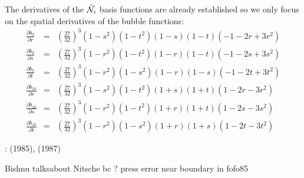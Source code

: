 The derivatives of the $\tilde{{\mathcal{N}}}_i$ basis functions are already established so we only focus on the spatial derivatives of the bubble functions:
\begin{eqnarray}
\frac{\partial b_9}{\partial r} 
&=& \left(\frac{27}{32}\right)^3 (1-s^2)(1-t^2) (1-s)(1-t) (-1-2r+3r^2  )\nonumber\\
\frac{\partial b_9}{\partial s}
&=& \left(\frac{27}{32}\right)^3 (1-r^2)(1-t^2) (1-r)(1-t) (-1-2s+3s^2  )\nonumber\\
\frac{\partial b_9}{\partial t}
&=& \left(\frac{27}{32}\right)^3 (1-r^2)(1-s^2) (1-r)(1-s) (-1-2t+3t^2  )\nonumber\\
\frac{\partial b_{10}}{\partial r} 
&=& \left(\frac{27}{32}\right)^3 (1-s^2)(1-t^2) (1+s)(1+t) (1-2r-3r^2  )\nonumber\\
\frac{\partial b_{10}}{\partial s}
&=& \left(\frac{27}{32}\right)^3 (1-r^2)(1-t^2) (1+r)(1+t) (1-2s-3s^2  )\nonumber\\
\frac{\partial b_{10}}{\partial t} 
&=& \left(\frac{27}{32}\right)^3 (1-r^2)(1-s^2) (1+r)(1+s) (1-2t-3t^2  ) \nonumber
\end{eqnarray}



\Literature: \textcite{fofo85} (1985), \textcite{sofo87} (1987)

Bishnu talksabout Nitsche bc ? press error near boundary in fofo85
















